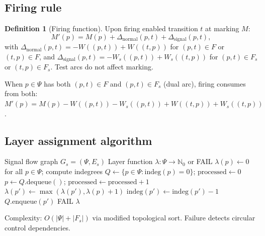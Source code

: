 \documentclass[11pt,a4paper]{article}
\theoremstyle{plain}
\theoremstyle{definition}
\newtheorem{definition}{Definition}
\begin{document}
\subsection{Firing rule}

\begin{definition}[Firing function]
Upon firing enabled transition $t$ at marking $M$:
\begin{equation}
M'(p) = M(p) + \Delta_{\mathrm{normal}}(p,t) + \Delta_{\mathrm{signal}}(p,t),
\end{equation}
with $\Delta_{\mathrm{normal}}(p,t) = -W((p,t)) + W((t,p))$ for $(p,t) \in F$ or $(t,p) \in F$, and $\Delta_{\mathrm{signal}}(p,t) = -W_s((p,t)) + W_s((t,p))$ for $(p,t) \in F_s$ or $(t,p) \in F_s$. Test arcs do not affect marking.
\end{definition}

When $p \in \Psi$ has both $(p,t) \in F$ and $(p,t) \in F_s$ (dual arc), firing consumes from both: $M'(p) = M(p) - W((p,t)) - W_s((p,t)) + W((t,p)) + W_s((t,p))$.

\subsection{Layer assignment algorithm}

\begin{algorithm}[htbp]
\caption{Hierarchical layer assignment.}\label{alg:layer}
\begin{algorithmic}[1]
\Require Signal flow graph $G_s = (\Psi, E_s)$
\Ensure Layer function $\lambda: \Psi \rightarrow \mathbb{N}_0$ or FAIL
\State $\lambda(p) \leftarrow 0$ for all $p \in \Psi$; compute indegrees
\State $Q \leftarrow \{p \in \Psi : \mathrm{indeg}(p) = 0\}$; $\mathrm{processed} \leftarrow 0$
    \State $p \leftarrow Q.\mathrm{dequeue}()$; $\mathrm{processed} \gets \mathrm{processed} + 1$
        \State $\lambda(p') \leftarrow \max(\lambda(p'), \lambda(p) + 1)$
        \State $\mathrm{indeg}(p') \gets \mathrm{indeg}(p') - 1$
         $Q.\mathrm{enqueue}(p')$ \EndIf
    \EndFor
\EndWhile
{} \Return FAIL 
\Else{} \Return $\lambda$ \EndIf
\end{algorithmic}
\end{algorithm}

Complexity: $O(|\Psi| + |F_s|)$ via modified topological sort. Failure detects circular control dependencies.
\end{document}
